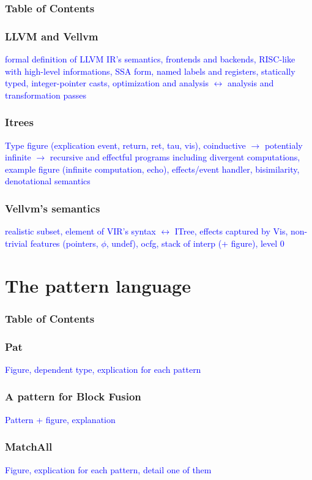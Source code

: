 \documentclass{beamer}
\newcommand{\leon}[1]{\textcolor{blue}{#1}}
\begin{document}
\begin{frame}
  \frametitle{Table of Contents}
  \tableofcontents[currentsection]
\end{frame}

\begin{frame}
  \frametitle{LLVM and Vellvm}
  \leon{formal definition of LLVM IR's semantics, frontends and backends, RISC-like with high-level informations, SSA form, named labels and registers, statically typed, integer-pointer casts, optimization and analysis $\leftrightarrow$ analysis and transformation passes}
\end{frame}

\begin{frame}
  \frametitle{Itrees}
  \leon{Type figure (explication event, return, ret, tau, vis), coinductive $\rightarrow$ potentialy infinite $\rightarrow$ recursive and effectful programs including divergent computations, example figure (infinite computation, echo), effects/event handler, bisimilarity, denotational semantics}
\end{frame}

\begin{frame}
  \frametitle{Vellvm's semantics}
  \leon{realistic subset, element of VIR's syntax $\leftrightarrow$ ITree, effects captured by Vis, non-trivial features (pointers, $\phi$, undef), ocfg, stack of interp (+ figure), level 0}
\end{frame}

\section{The pattern language}

\begin{frame}
  \frametitle{Table of Contents}
  \tableofcontents[currentsection]
\end{frame}

\begin{frame}
  \frametitle{Pat}
  \leon{Figure, dependent type, explication for each pattern}
\end{frame}

\begin{frame}
  \frametitle{A pattern for Block Fusion}
  \leon{Pattern + figure, explanation}
\end{frame}

\begin{frame}
  \frametitle{MatchAll}
  \leon{Figure, explication for each pattern, detail one of them}
\end{frame}
\end{document}
